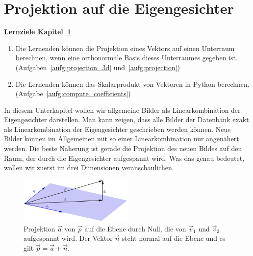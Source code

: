 \section{Projektion auf die Eigengesichter} \label{sec:eigenbasis}
\begin{tcolorbox}
	\centerline{\textbf{Lernziele Kapitel~\ref{sec:eigenbasis}}}
	\begin{enumerate}[leftmargin=*,label=\thesection.\arabic*]
		\item \label{item:projection} Die Lernenden können die Projektion eines Vektors auf einen Unterraum berechnen, wenn eine orthonormale Basis dieses Unterraumes gegeben ist.\\
		(Aufgaben~\ref{aufg:projection_3d} und~\ref{aufg:projection})
		\item \label{item:compute_coefficients} Die Lernenden können das Skalarprodukt von Vektoren in Python berechnen.\\
		(Aufgabe~\ref{aufg:compute_coefficients})
	\end{enumerate}
\end{tcolorbox}
In diesem Unterkapitel wollen wir allgemeine Bilder als Linearkombination der Eigengesichter darstellen.
Man kann zeigen, dass alle Bilder der Datenbank exakt als Linearkombination der Eigengesichter geschrieben werden können.
Neue Bilder können im Allgemeinen mit so einer Linearkombination nur angenähert werden.
Die beste Näherung ist gerade die Projektion des neuen Bildes auf den Raum, der durch die Eigengesichter aufgespannt wird.
Was das genau bedeutet, wollen wir zuerst im drei Dimensionen veranschaulichen.
\begin{figure}[ht]
	\centering
	\includegraphics[width=0.5\textwidth]{images/projection}
	\caption{Projektion $\vec a$ von $\vec p$ auf die Ebene durch Null, die von $\vec v_1$ und $\vec v_2$ aufgespannt wird. Der Vektor $\vec n$ steht normal auf die Ebene und es gilt $\vec p=\vec a+\vec n$.}
	\label{fig:projection}
\end{figure}

